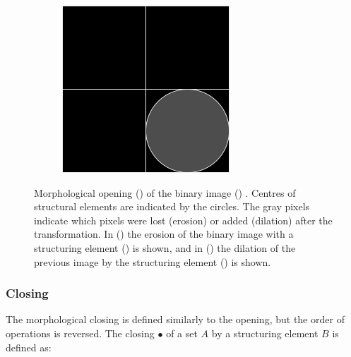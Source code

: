 \documentclass[
  digital,     %
  oneside,     %
  nosansbold,  %
  nocolorbold, %
  lof,         %
  lot,         %
]{fithesis4}
\begin{document}
\begin{figure}
\begin{subfigure}[t]{0.4\textwidth}
        \caption{}
        \label{fig:opening_dilation}
    \end{subfigure}
    \begin{subfigure}[t]{0.2\textwidth}
        \centering
        \includegraphics[width=\textwidth]{resources/inkscape/opening_dilation_se.png}
        \caption{}
        \label{fig:opening_dilation_se}
    \end{subfigure}
    \caption{Morphological opening () of the binary image () . Centres of structural elements are indicated by the circles. The gray pixels indicate which pixels
    were lost (erosion) or added (dilation) after the transformation. In () the erosion of the binary image with a structuring element () is shown, and in () the dilation of the previous image by the structuring element () is shown.}
    \label{fig:opening}
\end{figure}

\subsubsection{Closing}

The morphological closing is defined similarly to the opening, but the order of
operations is reversed. The closing $\bullet$ of a set $A$ by a structuring
element $B$ is defined as\cite{soile2004}:
\end{document}
